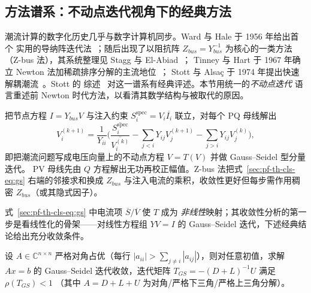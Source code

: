 \subsection{方法谱系：不动点迭代视角下的经典方法}\label{sec:pf-th-cls-lineage}

潮流计算的数字化历史几乎与数字计算机同步。Ward 与 Hale 于 1956 年给出首个
实用的导纳阵迭代法~\cite{cls:wardhale}；随后出现了以阻抗阵 $Z_{bus}=Y_{bus}^{-1}$
为核心的一类方法（Z-bus 法），其系统整理见 Stagg 与 El-Abiad~\cite{cls:stagg}；
Tinney 与 Hart 于 1967 年确立 Newton 法加稀疏排序分解的主流地位~\cite{cls:tinney}；
Stott 与 Alsa\c{c} 于 1974 年提出快速解耦潮流~\cite{cls:stott}。Stott 的
综述~\cite{cls:stottreview} 对这一谱系有经典评述。本节用统一的\emph{不动点迭代}
语言重述前 Newton 时代方法，以看清其数学结构与被取代的原因。

\begin{definition}\label{sec:pf-th-cls-def-gs}
把节点方程 $I=Y_{bus}V$ 与注入约束 $S_i^{\mathrm{spec}}=V_i\overline{I_i}$
联立，对每个 PQ 母线解出
\begin{equation}
V_i^{(k+1)}=\frac{1}{Y_{ii}}\Biggl(\frac{\overline{S_i^{\mathrm{spec}}}}{\overline{V_i^{(k)}}}
-\sum_{j<i}Y_{ij}V_j^{(k+1)}-\sum_{j>i}Y_{ij}V_j^{(k)}\Biggr),
\label{sec:pf-th-cls-eq:gs}
\end{equation}
即把潮流问题写成电压向量上的不动点方程 $V=T(V)$ 并做 Gauss--Seidel 型分量迭代。
PV 母线先由 $Q$ 方程解出无功再校正幅值。Z-bus 法把式~\eqref{sec:pf-th-cls-eq:gs}
右端的邻接求和换成 $Z_{bus}$ 与注入电流的乘积，收敛性更好但每步需作用稠密
$Z_{bus}$（或其隐式因子）。
\end{definition}

式~\eqref{sec:pf-th-cls-eq:gs} 中电流项 $\overline{S}/\overline{V}$ 使 $T$ 成为
\emph{非线性}映射；其收敛性分析的第一步是看线性化的骨架——对线性方程组
$YV=I$ 的 Gauss--Seidel 迭代，下述经典结论给出充分收敛条件。

\begin{theorem}\label{sec:pf-th-cls-thm-gs}
设 $A\in\mathbb C^{n\times n}$ 严格对角占优（每行
$|a_{ii}|>\sum_{j\ne i}|a_{ij}|$），则对任意初值，求解 $Ax=b$ 的
Gauss--Seidel 迭代收敛，迭代矩阵 $T_{GS}=-(D+L)^{-1}U$ 满足 $\rho(T_{GS})<1$
（其中 $A=D+L+U$ 为对角/严格下三角/严格上三角分解）。
\end{theorem}

